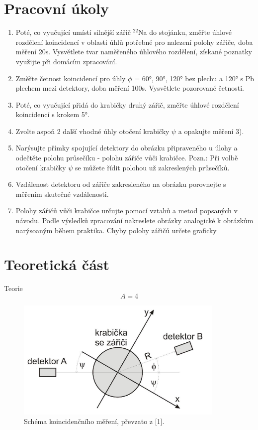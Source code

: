 \documentclass[10pt,a4paper]{article}
\begin{document}


\section{Pracovní úkoly}
\begin{enumerate}
    \item Poté, co vyučující umístí silnější zářič ${}^{22}$Na do stojánku, změřte úhlové rozdělení koincidencí v oblasti úhlů potřebné pro nalezení polohy zářiče, doba měření 20s. Vysvětlete tvar naměřeného úhlového rozdělení, získané poznatky využijte při domácím zpracování.

    \item Změřte četnost koincidencí pro úhly $\phi$ = 60°, 90°, 120° bez plechu a 120° s Pb plechem mezi detektory, doba měření 100s. Vysvětlete pozorované četnosti.
    
    \item Poté, co vyučující přidá do krabičky druhý zářič, změřte úhlové rozdělení koincidencí s krokem 5°.
    
    \item Zvolte aspoň 2 další vhodné úhly otočení krabičky $\psi$ a opakujte měření 3).
    
    \item Narýsujte přímky spojující detektory do obrázku připraveného u úlohy a odečtěte polohu průsečíku - polohu zářiče vůči krabičce. Pozn.: Při volbě otočení krabičky $\psi$ se můžete řídit polohou už zakreslených průsečíků.
    
    \item Vzdálenost detektoru od zářiče zakresleného na obrázku porovnejte s měřením skutečné vzdálenosti.
    
    \item Polohy zářičů vůči krabičce určujte pomocí vztahů a metod popsaných v návodu. Podle výsledků zpracování nakreslete obrázky analogické k obrázkům narýsoaným během praktika. Chyby polohy zářičů určete graficky
\end{enumerate}


\section{Teoretická část}
Teorie\cite{DUMMY:1}
\begin{equation*}
    A = 4
    \label{A}
\end{equation*}

\begin{figure}[h]
    \centering
    \includegraphics[width=10cm]{schema.png}
    \caption{Schéma koincidenčního měření, převzato z [1].}
\end{figure}
\end{document}
